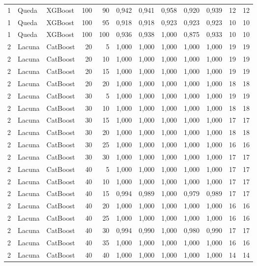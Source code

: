 \begin{longtable}{@{}rllrrrrrrrrr@{}}
1 & Queda & XGBoost & 100 & 90 & 0,942 & 0,941 & 0,958 & 0,920 & 0,939 & 12 & 12 \\
1 & Queda & XGBoost & 100 & 95 & 0,918 & 0,918 & 0,923 & 0,923 & 0,923 & 10 & 10 \\
1 & Queda & XGBoost & 100 & 100 & 0,936 & 0,938 & 1,000 & 0,875 & 0,933 & 10 & 10 \\
2 & Lacuna & CatBoost & 20 & 5 & 1,000 & 1,000 & 1,000 & 1,000 & 1,000 & 19 & 19 \\
2 & Lacuna & CatBoost & 20 & 10 & 1,000 & 1,000 & 1,000 & 1,000 & 1,000 & 19 & 19 \\
2 & Lacuna & CatBoost & 20 & 15 & 1,000 & 1,000 & 1,000 & 1,000 & 1,000 & 19 & 19 \\
2 & Lacuna & CatBoost & 20 & 20 & 1,000 & 1,000 & 1,000 & 1,000 & 1,000 & 18 & 18 \\
2 & Lacuna & CatBoost & 30 & 5 & 1,000 & 1,000 & 1,000 & 1,000 & 1,000 & 19 & 19 \\
2 & Lacuna & CatBoost & 30 & 10 & 1,000 & 1,000 & 1,000 & 1,000 & 1,000 & 18 & 18 \\
2 & Lacuna & CatBoost & 30 & 15 & 1,000 & 1,000 & 1,000 & 1,000 & 1,000 & 17 & 17 \\
2 & Lacuna & CatBoost & 30 & 20 & 1,000 & 1,000 & 1,000 & 1,000 & 1,000 & 18 & 18 \\
2 & Lacuna & CatBoost & 30 & 25 & 1,000 & 1,000 & 1,000 & 1,000 & 1,000 & 16 & 16 \\
2 & Lacuna & CatBoost & 30 & 30 & 1,000 & 1,000 & 1,000 & 1,000 & 1,000 & 17 & 17 \\
2 & Lacuna & CatBoost & 40 & 5 & 1,000 & 1,000 & 1,000 & 1,000 & 1,000 & 17 & 17 \\
2 & Lacuna & CatBoost & 40 & 10 & 1,000 & 1,000 & 1,000 & 1,000 & 1,000 & 17 & 17 \\
2 & Lacuna & CatBoost & 40 & 15 & 0,994 & 0,989 & 1,000 & 0,979 & 0,989 & 17 & 17 \\
2 & Lacuna & CatBoost & 40 & 20 & 1,000 & 1,000 & 1,000 & 1,000 & 1,000 & 16 & 16 \\
2 & Lacuna & CatBoost & 40 & 25 & 1,000 & 1,000 & 1,000 & 1,000 & 1,000 & 16 & 16 \\
2 & Lacuna & CatBoost & 40 & 30 & 0,994 & 0,990 & 1,000 & 0,980 & 0,990 & 17 & 17 \\
2 & Lacuna & CatBoost & 40 & 35 & 1,000 & 1,000 & 1,000 & 1,000 & 1,000 & 16 & 16 \\
2 & Lacuna & CatBoost & 40 & 40 & 1,000 & 1,000 & 1,000 & 1,000 & 1,000 & 14 & 14 \\

\end{longtable}
